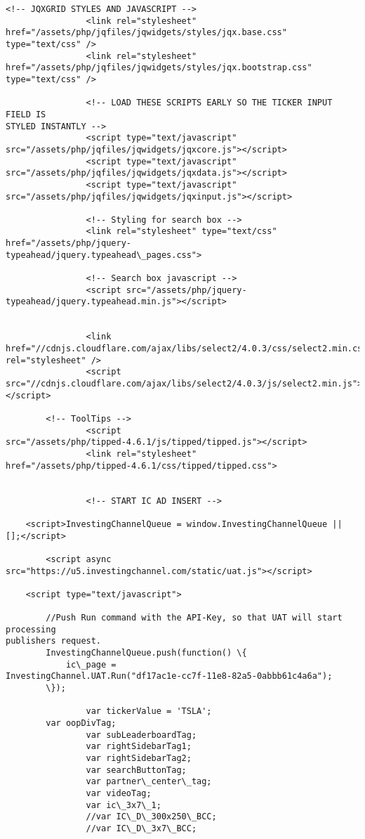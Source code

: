 \documentclass[11pt]{article}
\begin{document}
\begin{Verbatim}[commandchars=\\\{\}]
                <!-- JQXGRID STYLES AND JAVASCRIPT -->
                <link rel="stylesheet"
href="/assets/php/jqfiles/jqwidgets/styles/jqx.base.css" type="text/css" />
                <link rel="stylesheet"
href="/assets/php/jqfiles/jqwidgets/styles/jqx.bootstrap.css" type="text/css" />

                <!-- LOAD THESE SCRIPTS EARLY SO THE TICKER INPUT FIELD IS
STYLED INSTANTLY -->
                <script type="text/javascript"
src="/assets/php/jqfiles/jqwidgets/jqxcore.js"></script>
                <script type="text/javascript"
src="/assets/php/jqfiles/jqwidgets/jqxdata.js"></script>
                <script type="text/javascript"
src="/assets/php/jqfiles/jqwidgets/jqxinput.js"></script>

                <!-- Styling for search box -->
                <link rel="stylesheet" type="text/css" href="/assets/php/jquery-
typeahead/jquery.typeahead\_pages.css">

                <!-- Search box javascript -->
                <script src="/assets/php/jquery-
typeahead/jquery.typeahead.min.js"></script>


                <link
href="//cdnjs.cloudflare.com/ajax/libs/select2/4.0.3/css/select2.min.css"
rel="stylesheet" />
                <script
src="//cdnjs.cloudflare.com/ajax/libs/select2/4.0.3/js/select2.min.js"></script>

        <!-- ToolTips -->
                <script
src="/assets/php/tipped-4.6.1/js/tipped/tipped.js"></script>
                <link rel="stylesheet"
href="/assets/php/tipped-4.6.1/css/tipped/tipped.css">


                <!-- START IC AD INSERT -->

    <script>InvestingChannelQueue = window.InvestingChannelQueue || [];</script>

        <script async
src="https://u5.investingchannel.com/static/uat.js"></script>

    <script type="text/javascript">

        //Push Run command with the API-Key, so that UAT will start processing
publishers request.
        InvestingChannelQueue.push(function() \{
            ic\_page =
InvestingChannel.UAT.Run("df17ac1e-cc7f-11e8-82a5-0abbb61c4a6a");
        \});

                var tickerValue = 'TSLA';
        var oopDivTag;
                var subLeaderboardTag;
                var rightSidebarTag1;
                var rightSidebarTag2;
                var searchButtonTag;
                var partner\_center\_tag;
                var videoTag;
                var ic\_3x7\_1;
                //var IC\_D\_300x250\_BCC;
                //var IC\_D\_3x7\_BCC;


\end{Verbatim}
\end{document}
